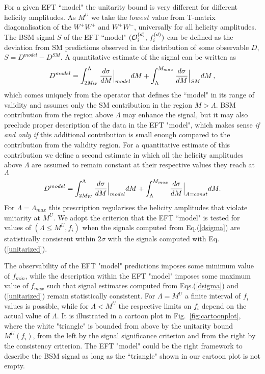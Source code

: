 For a given EFT ``model" the unitarity bound is very different for  different helicity amplitudes.
As  $M^U$ we take  the $lowest$ value from T-matrix diagonalisation of the $W^+W^+$ and $W^+W^-$, universally for all helicity 
amplitudes. 
The BSM signal  $S$ of the EFT ``model" $({\cal O}_i^{(d)},\,f_i^{(d)})$ 
can be defined as the deviation from SM predictions observed in the distribution of some observable $D$,  
$S=D^{model}-D^{SM}$.
A quantitative estimate of the signal can be written as
\small
\begin{equation} 
D^{model}=\int^{\Lambda}_{2M_W}\frac{d\sigma}{dM} \Bigl|_{model} dM +\int_{\Lambda}^{M_{max}}\frac{d\sigma}{dM}\Bigr|_{SM} dM\,,
\label{dsigma}
\end{equation}
\normalsize
which comes uniquely from the operator that defines the ``model" in its range
of validity and assumes only the SM contribution in the region $M>\Lambda$.
BSM contribution from the region above $\Lambda$   may enhance the signal, but it may also 
preclude proper description of the data in the EFT  "model",
which makes sense {\it if and only if} this additional contribution is small enough  
compared to the contribution from the validity region.  
For a  quantitative estimate of this 
contribution we define a second estimate in which  all the helicity amplitudes above 
$\Lambda$ are assumed to remain 
constant at their respective values they reach at $\Lambda$
\small
\begin{equation}
D^{model}=\int^{\Lambda}_{2M_W}\frac{d\sigma}{dM}\Bigl|_{model} dM +\int_{\Lambda}^{M_{max}}\frac{d\sigma}{dM}\Bigr|_{A=const} dM.
\label{unitarized}
\end{equation}
\normalsize
For $\Lambda = \Lambda_{max}$ this prescription regularises the helicity amplitudes that violate unitarity at $M^U$. 
We adopt the criterion that the EFT ``model" is tested for values of $(\Lambda\leq M^U, f_i)$ 
when the signals computed from Eq.(\ref{dsigma}) are statistically consistent 
within 2$\sigma$ with the signals computed with Eq.(\ref{unitarized}).

The observability of  the EFT "model" predictions imposes some minimum value of $f_{min}$, while the description within the EFT "model" imposes some 
maximum value of $f_{max}$ such that signal
estimates computed from Eqs.(\ref{dsigma}) and (\ref{unitarized}) remain 
statistically consistent.  
For $\Lambda=M^U$ a finite interval of $f_i$ values is possible, while 
for $\Lambda <M^U$ the  respective limits on $f_i$  depend on the actual value of $\Lambda$. It is illustrated in 
a cartoon plot in Fig.~\ref{fig:cartoonplot}, where the white "triangle" is bounded from 
above by the unitarity bound $M^U(f_i)$, from the left by the signal significance criterion 
and from the right by the consistency criterion.
The EFT "model" could be the right framework to describe the  BSM signal as long as the ``triangle"
shown in our cartoon plot is not empty.  






